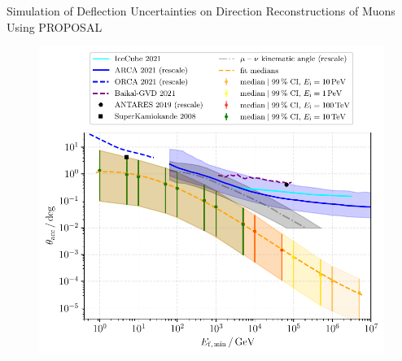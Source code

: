 \documentclass[t]{beamer}
\begin{document}
  \begin{columns}[onlytextwidth]%
          \begin{block}[equal height group=J]{Simulation of Deflection Uncertainties on Direction Reconstructions of Muons Using PROPOSAL}%

            \begin{figure}
              \includegraphics[width=0.3\linewidth, height=.4\textheight, keepaspectratio]{plots/fit_median_defl_cut_10percent_only_poly_new_resolution_rescale_no_icecube_paper_final_all.pdf}
            \end{figure}

          \end{block}
  \end{columns}%
\end{document}

